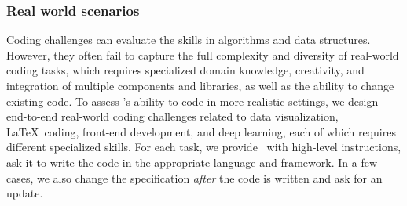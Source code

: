 \subsubsection{Real world scenarios}
Coding challenges can evaluate the skills in algorithms and data structures. However, they often fail to capture the full complexity and diversity of real-world coding tasks, which requires specialized domain knowledge, creativity, and integration of multiple components and libraries, as well as the ability to change existing code. 
To assess \DV's ability to code in more realistic settings, we design end-to-end real-world coding challenges related to data visualization, \LaTeX\ coding, front-end development, and deep learning, each of which requires different specialized skills.
For each task, we provide \DV\ with high-level instructions, ask it to write the code in the appropriate language and framework. In a few cases, we also change the specification \emph{after} the code is written and ask for an update.

